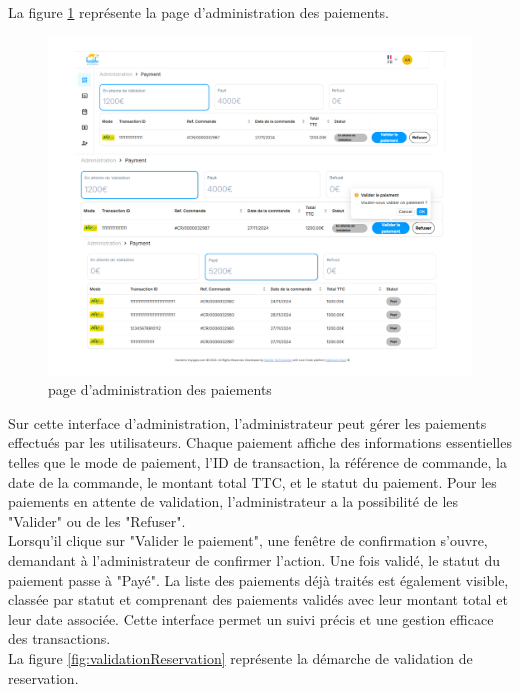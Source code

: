 \documentclass[12pt]{report}
\begin{document}
			La figure \ref{fig:validationPaiement} représente la page d'administration des paiements.

			\begin{figure}[h]
				\centering
				\includegraphics[width=\textwidth]{validationPaiement.png}
				\caption{ page d'administration des paiements}
				\label{fig:validationPaiement}
			\end{figure}
			\FloatBarrier

			Sur cette interface d'administration, l'administrateur peut gérer les paiements effectués par les utilisateurs. Chaque paiement affiche des informations essentielles telles que le mode de paiement, l'ID de transaction, la référence de commande, la date de la commande, le montant total TTC, et le statut du paiement. Pour les paiements en attente de validation, l'administrateur a la possibilité de les "Valider" ou de les "Refuser".\\

			Lorsqu'il clique sur "Valider le paiement", une fenêtre de confirmation s'ouvre, demandant à l'administrateur de confirmer l'action. Une fois validé, le statut du paiement passe à "Payé". La liste des paiements déjà traités est également visible, classée par statut et comprenant des paiements validés avec leur montant total et leur date associée. Cette interface permet un suivi précis et une gestion efficace des transactions.\\

			La figure \ref{fig:validationReservation} représente la démarche de validation de reservation.
\end{document}
